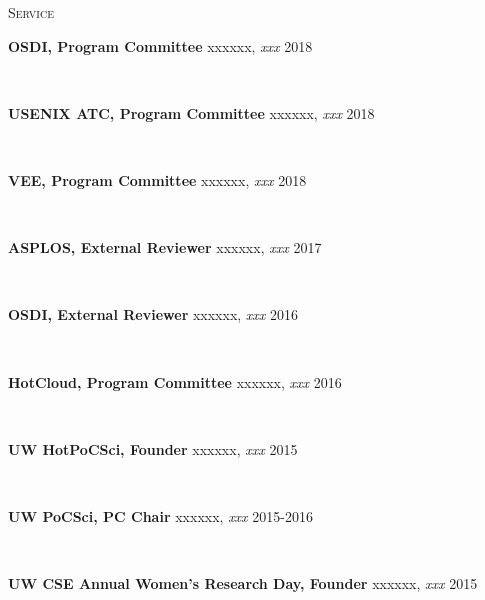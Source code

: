 \documentclass[10pt,times]{report}
\newlength{\sectiongap}
\newlength{\entrygap}
\newlength{\sectioncolwidth}
\newlength{\colgap}
\newlength{\stuffwidth}
\def\ifEqString#1#2{\def\testa{#1}\def\testb{#2}%
  \ifx\testa\testb}
\newenvironment{rtable}{
  \begin{minipage}{\textwidth}
  }{
  \end{minipage}
}
\newenvironment{rentry}[3][xxx]{
  \begin{minipage}[t]{\hsize}
    \textbf{#2}\ifEqString{#1}{xxx}\relax\else, \textit{#1}\fi
    \hspace{\stretch{1}} #3 \\
  }{
    \removelastskip
  \end{minipage}
  \\[\entrygap]  %
}
\newcommand{\rline}[2]{
  \begin{minipage}[t]{\hsize}
    #1 \hspace{\stretch{1}} #2
  \end{minipage} \\
}
\newenvironment{rsection}[1]{
  \begin{minipage}[t]{\sectioncolwidth}
    \textsc{#1}
  \end{minipage}
  \hspace{\colgap}
  \begin{minipage}[t]{\stuffwidth}
  }{
    \removelastskip
  \end{minipage}
  \\[\sectiongap]
}
\begin{document}
\begin{rtable}
\begin{rsection}{Service}
\begin{rentry}{OSDI, Program Committee}{2018}
       \vspace{-0.5em}
    \end{rentry}
    \begin{rentry}{USENIX ATC, Program Committee}{2018}
       \vspace{-0.5em}
    \end{rentry}
    \begin{rentry}{VEE, Program Committee}{2018}
       \vspace{-0.5em}
    \end{rentry}
    \begin{rentry}{ASPLOS, External Reviewer}{2017}
       \vspace{-0.5em}
    \end{rentry}
    \begin{rentry}{OSDI, External Reviewer}{2016}
       \vspace{-0.5em}
    \end{rentry}
    \begin{rentry}{HotCloud, Program Committee}{2016}
       \vspace{-0.5em}
    \end{rentry}
    \begin{rentry}{UW HotPoCSci, Founder}{2015}
       \vspace{-0.5em}
    \end{rentry}
    \begin{rentry}{UW PoCSci, PC Chair}{2015-2016}
       \vspace{-0.5em}
    \end{rentry}
    \begin{rentry}{UW CSE Annual Women's Research Day, Founder}{2015}
       \vspace{-0.5em}
    \end{rentry}
  \end{rsection}

\end{rtable}
\end{document}
